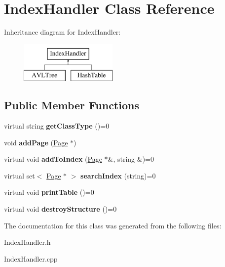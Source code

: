 \hypertarget{class_index_handler}{\section{Index\+Handler Class Reference}
\label{class_index_handler}
}
Inheritance diagram for Index\+Handler\+:\begin{figure}[H]
\begin{center}
\leavevmode
\includegraphics[height=2.000000cm]{class_index_handler}
\end{center}
\end{figure}
\subsection*{Public Member Functions}
\begin{DoxyCompactItemize}
\item 
\hypertarget{class_index_handler_ab79b5f2c35d6cff25d58e72c18af60ea}{virtual string {\bfseries get\+Class\+Type} ()=0}\label{class_index_handler_ab79b5f2c35d6cff25d58e72c18af60ea}

\item 
\hypertarget{class_index_handler_aa916a3613990ed790d281863d685cfc5}{void {\bfseries add\+Page} (\hyperlink{class_page}{Page} $\ast$)}\label{class_index_handler_aa916a3613990ed790d281863d685cfc5}

\item 
\hypertarget{class_index_handler_a8bce6003281670e4adfb900c07a86d99}{virtual void {\bfseries add\+To\+Index} (\hyperlink{class_page}{Page} $\ast$\&, string \&)=0}\label{class_index_handler_a8bce6003281670e4adfb900c07a86d99}

\item 
\hypertarget{class_index_handler_aea6754222ce40912e1dc71e7b00c61e1}{virtual set$<$ \hyperlink{class_page}{Page} $\ast$ $>$ {\bfseries search\+Index} (string)=0}\label{class_index_handler_aea6754222ce40912e1dc71e7b00c61e1}

\item 
\hypertarget{class_index_handler_a036ccca02cb734711a1e6a50b09a2b1f}{virtual void {\bfseries print\+Table} ()=0}\label{class_index_handler_a036ccca02cb734711a1e6a50b09a2b1f}

\item 
\hypertarget{class_index_handler_ab3bcb75df49d1b86050c55f1a4526576}{virtual void {\bfseries destroy\+Structure} ()=0}\label{class_index_handler_ab3bcb75df49d1b86050c55f1a4526576}

\end{DoxyCompactItemize}


The documentation for this class was generated from the following files\+:\begin{DoxyCompactItemize}
\item 
Index\+Handler.\+h\item 
Index\+Handler.\+cpp\end{DoxyCompactItemize}
